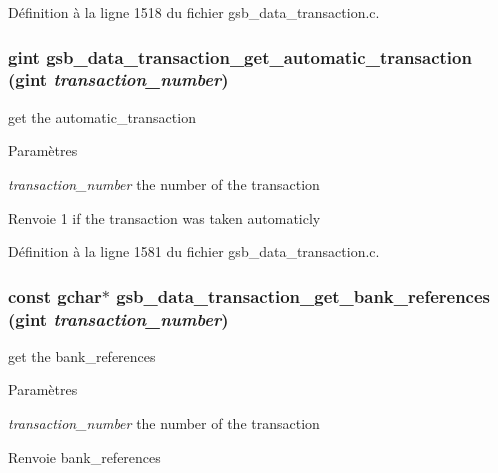 Définition à la ligne 1518 du fichier gsb\_\-data\_\-transaction.c.

\subsubsection[{gsb\_\-data\_\-transaction\_\-get\_\-automatic\_\-transaction}]{\setlength{\rightskip}{0pt plus 5cm}gint gsb\_\-data\_\-transaction\_\-get\_\-automatic\_\-transaction (gint {\em transaction\_\-number})}\label{gsb__data__transaction_8h_a4cc433dd23e93537f8554d6e1532f794}
get the automatic\_\-transaction 
\begin{DoxyParams}{Paramètres}
\item[{\em transaction\_\-number}]the number of the transaction \end{DoxyParams}
\begin{DoxyReturn}{Renvoie}
1 if the transaction was taken automaticly 
\end{DoxyReturn}


Définition à la ligne 1581 du fichier gsb\_\-data\_\-transaction.c.

\subsubsection[{gsb\_\-data\_\-transaction\_\-get\_\-bank\_\-references}]{\setlength{\rightskip}{0pt plus 5cm}const gchar$\ast$ gsb\_\-data\_\-transaction\_\-get\_\-bank\_\-references (gint {\em transaction\_\-number})}\label{gsb__data__transaction_8h_a8ef7712f47278152551c3d9454ecf36a}
get the bank\_\-references


\begin{DoxyParams}{Paramètres}
\item[{\em transaction\_\-number}]the number of the transaction\end{DoxyParams}
\begin{DoxyReturn}{Renvoie}
bank\_\-references 
\end{DoxyReturn}


